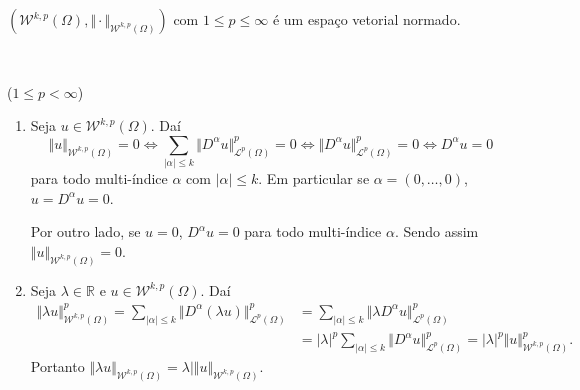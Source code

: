 \documentclass[a4paper, 11pt]{book}
\theoremstyle{definition}
\newcommand{\bR}{\mathbb{R}}
\newcommand{\cL}{\mathcal{L}}
\newcommand{\cW}{\mathcal{W}}
\begin{document}
\begin{tbox}
    $(\cW^{k,p}(\Omega), \Vert \cdot \Vert_{\cW^{k,p}(\Omega)})$ com $1 \leqslant p \leqslant \infty$ é um espaço vetorial normado.
\end{tbox}
\begin{prf}
    ~

    ($1 \leqslant p < \infty$)
    \begin{enumerate}[leftmargin=*]
        \item Seja $u \in \cW^{k,p}(\Omega)$. Daí
        \[
            \Vert u \Vert_{\cW^{k,p}(\Omega)} = 0 \iff \sum_{|\alpha| \leqslant k} \Vert D^\alpha u \Vert_{\cL^p(\Omega)}^p = 0 \iff \Vert D^\alpha u \Vert_{\cL^p(\Omega)}^p = 0 \iff D^\alpha u = 0
        \]
        para todo multi-índice $\alpha$ com $|\alpha| \leqslant k$.
        Em particular se $\alpha = (0,\dots,0)$, $u = D^\alpha u = 0$.

        Por outro lado, se $u = 0$, $D^\alpha u = 0$ para todo multi-índice $\alpha$. Sendo assim $\Vert u \Vert_{\cW^{k,p}(\Omega)} = 0$.

        \item Seja $\lambda \in \bR$ e $u \in \cW^{k,p}(\Omega)$. Daí
        \[
            \begin{aligned}
                \Vert \lambda u \Vert_{\cW^{k,p}(\Omega)}^p = \sum_{|\alpha| \leqslant k} \Vert D^\alpha (\lambda u) \Vert_{\cL^p(\Omega)}^p &= \sum_{|\alpha| \leqslant k} \Vert \lambda D^\alpha u \Vert_{\cL^p(\Omega)}^p\\ 
                &= |\lambda|^p\sum_{|\alpha| \leqslant k} \Vert D^\alpha u \Vert_{\cL^p(\Omega)}^p = |\lambda|^p\Vert u \Vert_{\cW^{k,p}(\Omega)}^p.
            \end{aligned}
        \]
        Portanto $\Vert \lambda u \Vert_{\cW^{k,p}(\Omega)} = \lambda|\Vert u \Vert_{\cW^{k,p}(\Omega)}$.


\end{enumerate}
\end{prf}
\end{document}
